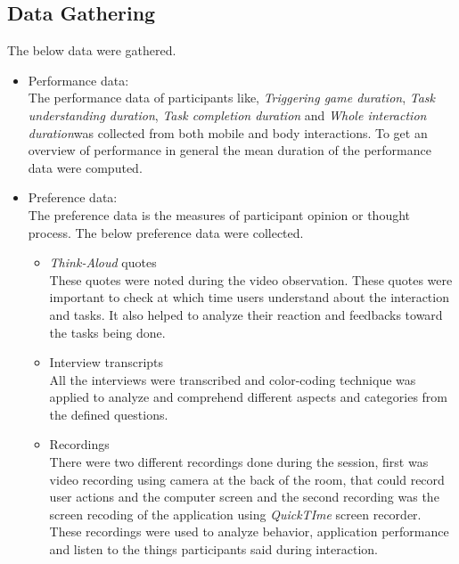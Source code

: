 \subsection{Data Gathering }
The below data were gathered.

\begin{itemize}

\item Performance data: \\
 The performance data of participants like, \emph{Triggering game duration}, \emph{Task understanding duration}, \emph{Task completion duration} and \emph{Whole interaction duration}was collected from both mobile and body interactions. To get an overview of performance in general the mean duration of the performance data were computed.

\item Preference data: \\
The preference data is the measures of participant opinion or thought process. The below preference data were collected.

\begin{itemize}

\item \emph{Think-Aloud} quotes \\
These quotes were noted during the video observation. These quotes were important to check at which time users understand about the interaction and tasks. 
It also helped to analyze their reaction and feedbacks toward the tasks being done.

\item Interview transcripts \\
All the interviews were transcribed and color-coding technique was applied to analyze and comprehend different aspects and categories from the defined questions.


\item Recordings \\
There were two different recordings done during the session, first was video recording using camera at the back of the room, that could record user actions and the computer screen and the second recording was the screen recoding of the application using \emph{QuickTIme} screen recorder. These recordings were used to analyze behavior, application performance and listen to the things participants said during interaction.


\end{itemize}




\end{itemize}
